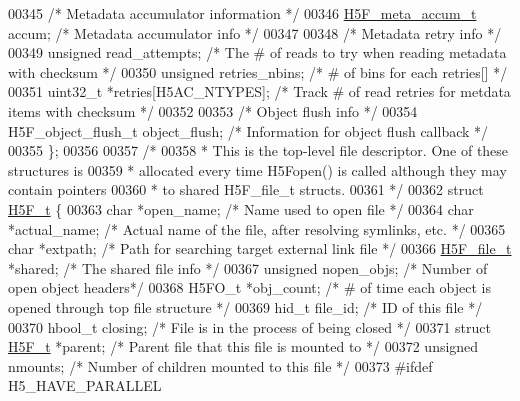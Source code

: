 \begin{DoxyCode}
00345     \textcolor{comment}{/* Metadata accumulator information */}
00346     \hyperlink{struct_h5_f__meta__accum__t}{H5F\_meta\_accum\_t} accum;     \textcolor{comment}{/* Metadata accumulator info            */}
00347 
00348     \textcolor{comment}{/* Metadata retry info */}
00349     \textcolor{keywordtype}{unsigned}        read\_attempts;  \textcolor{comment}{/* The # of reads to try when reading metadata with checksum */}
00350     \textcolor{keywordtype}{unsigned}        retries\_nbins;      \textcolor{comment}{/* # of bins for each retries[] */}
00351     uint32\_t        *retries[H5AC\_NTYPES];  \textcolor{comment}{/* Track # of read retries for metdata items with checksum */}
00352 
00353     \textcolor{comment}{/* Object flush info */}
00354     H5F\_object\_flush\_t  object\_flush;       \textcolor{comment}{/* Information for object flush callback */}
00355 \};
00356 
00357 \textcolor{comment}{/*}
00358 \textcolor{comment}{ * This is the top-level file descriptor.  One of these structures is}
00359 \textcolor{comment}{ * allocated every time H5Fopen() is called although they may contain pointers}
00360 \textcolor{comment}{ * to shared H5F\_file\_t structs.}
00361 \textcolor{comment}{ */}
00362 \textcolor{keyword}{struct }\hyperlink{struct_h5_f__t}{H5F\_t} \{
00363     \textcolor{keywordtype}{char}        *open\_name; \textcolor{comment}{/* Name used to open file   */}
00364     \textcolor{keywordtype}{char}        *actual\_name;   \textcolor{comment}{/* Actual name of the file, after resolving symlinks, etc. */}
00365     \textcolor{keywordtype}{char}                *extpath;       \textcolor{comment}{/* Path for searching target external link file */}
00366     \hyperlink{struct_h5_f__file__t}{H5F\_file\_t}        *shared;    \textcolor{comment}{/* The shared file info     */}
00367     \textcolor{keywordtype}{unsigned}        nopen\_objs; \textcolor{comment}{/* Number of open object headers*/}
00368     H5FO\_t              *obj\_count;     \textcolor{comment}{/* # of time each object is opened through top file structure */}
00369     hid\_t               file\_id;        \textcolor{comment}{/* ID of this file              */}
00370     hbool\_t             closing;        \textcolor{comment}{/* File is in the process of being closed */}
00371     \textcolor{keyword}{struct }\hyperlink{struct_h5_f__t}{H5F\_t}        *parent;        \textcolor{comment}{/* Parent file that this file is mounted to */}
00372     \textcolor{keywordtype}{unsigned}            nmounts;        \textcolor{comment}{/* Number of children mounted to this file */}
00373 \textcolor{preprocessor}{#ifdef H5\_HAVE\_PARALLEL}

\end{DoxyCode}
